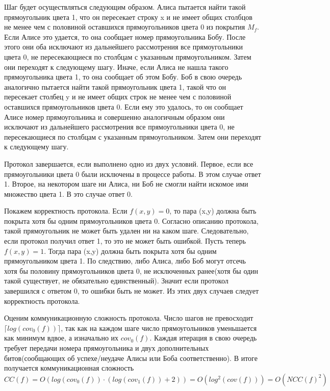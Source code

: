 \documentclass[12pt]{article}
\begin{document}
Шаг будет осуществляться следующим образом. Алиса пытается найти такой
прямоугольник цвета 1, что он пересекает строку x и не имеет общих столбцов не менее чем с половиной оставшихся прямоугольников цвета 0 из покрытия $M_f$.
Если Алисе это удается, то она сообщает номер прямоугольника Бобу.
После этого они оба исключают из дальнейшего рассмотрения все
прямоугольники цвета 0, не пересекающиеся по столбцам с указанным прямоугольником. Затем они переходят к следующему шагу.
Иначе, если Алиса не нашла такого прямоугольника цвета 1, то она сообщает об этом Бобу.
Боб в свою очередь аналогично пытается  найти такой прямоугольник цвета 1, такой что он пересекает столбец y и не имеет общих строк не менее чем с половиной оставшихся прямоугольников цвета 0.
Если ему это удалось, то он сообщает Алисе номер прямоугольника и совершенно аналогичным образом они исключают из дальнейшего рассмотрения все прямоугольники цвета 0, не пересекающиеся по столбцам с указанным прямоугольником. Затем они переходят к следующему шагу.

Протокол завершается, если выполнено одно из двух условий. Первое, если все прямоугольники цвета 0 были исключены в процессе работы. В этом случае ответ 1. Второе, на некотором шаге ни Алиса, ни Боб не смогли найти искомое ими множество цвета 1. В это случае ответ 0.


Покажем корректность протокола. Если $f(x, y)=0$, то пара (x,y) должна быть покрыта хотя бы одним прямоугольников цвета 0.
Согласно описанию протокола, такой прямоугольник не может быть удален ни на каком шаге.
Следовательно, если протокол получил ответ 1, то это не может быть ошибкой.
Пусть теперь $f(x, y)=1$. Тогда пара (x,y) должна быть покрыта хотя бы одним прямоугольником цвета 1.
По следствию, либо Алиса, либо Боб могут отсечь хотя бы половину прямоугольников цвета 0, не исключенных ранее(хотя бы один такой существует, не обязательно единственный).
Значит если протокол завершился с ответом 0, то ошибки быть не может.
Из этих двух случаев следует корректность протокола.


Оценим коммуникационную сложность протокола.
Число шагов не превосходит $\lceil log(cov_0(f)) \rceil$,
так как на каждом шаге число прямоугольников уменьшается как минимум вдвое, а изначально их $cov_0(f)$.
Каждая итерация в свою очередь требует передачи номера прямоугольника и двух дополнительных битов(сообщающих об успехе/неудаче Алисы или Боба соответственно).
В итоге получается коммуникационная сложность
$$ CC(f)=O(log(cov_0(f)) \cdot (log(cov_1(f))+2))
= O(log^2(cov(f))) = O(NCC(f)^2)$$
\end{document}
